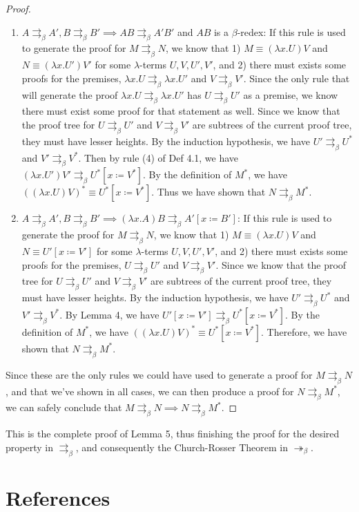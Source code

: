 \documentclass[a4paper,11pt]{article}
\theoremstyle{definition}
\theoremstyle{example}
\theoremstyle{lemma}
\newcommand{\lamterm}[2]{\lambda #1. #2}
\newcommand{\subs}[3]{#1[#2\coloneqq#3]}
\newcommand{\msbr}{\twoheadrightarrow_{\beta}}
\newcommand{\pbr}{\rightrightarrows_{\beta}}
\begin{document}
\begin{proof}
\begin{enumerate}[topsep=2pt,itemsep=-0.5ex,partopsep=1ex,parsep=1ex]
    \item $A \pbr A', B \pbr B' \implies AB \pbr A'B'$ and $AB$ is a $\beta$-redex: If this rule is used to generate the proof for $M \pbr N$, we know that 1) $M \equiv (\lamterm{x}{U})V$ and $N \equiv (\lamterm{x}{U'})V'$ for some $\lambda$-terms $U, V, U', V'$, and 2) there must exists some proofs for the premises, $\lamterm{x}{U} \pbr \lamterm{x}{U'}$ and $V \pbr V'$. Since the only rule that will generate the proof $\lamterm{x}{U} \pbr \lamterm{x}{U'}$ has $U \pbr U'$ as a premise, we know there must exist some proof for that statement as well. Since we know that the proof tree for $U \pbr U'$ and $V \pbr V'$ are subtrees of the current proof tree, they must have lesser heights. By the induction hypothesis, we have $U' \pbr U^*$ and $V' \pbr V^*$. Then by rule (4) of Def 4.1, we have $(\lamterm{x}{U'})V' \pbr \subs{U^*}{x}{V^*}$. By the definition of $M^*$, we have $((\lamterm{x}{U})V)^* \equiv \subs{U^*}{x}{V^*}$. Thus we have shown that $N \pbr M^*$.
     \item $A \pbr A', B \pbr B' \implies (\lamterm{x}{A})B \pbr \subs{A'}{x}{B'}$: If this rule is used to generate the proof for $M \pbr N$, we know that 1) $M \equiv (\lamterm{x}{U})V$ and $N \equiv \subs{U'}{x}{V'}$ for some $\lambda$-terms $U, V, U', V'$, and 2) there must exists some proofs for the premises, $U \pbr U'$ and $V \pbr V'$. Since we know that the proof tree for $U \pbr U'$ and $V \pbr V'$ are subtrees of the current proof tree, they must have lesser heights. By the induction hypothesis, we have $U' \pbr U^*$ and $V' \pbr V^*$. By Lemma 4, we have $\subs{U'}{x}{V'} \pbr \subs{U^*}{x}{V^*}$. By the definition of $M^*$, we have $((\lamterm{x}{U})V)^* \equiv \subs{U^*}{x}{V^*}$. Therefore, we have shown that $N \pbr M^*$.
\end{enumerate}
Since these are the only rules we could have used to generate a proof for $M \pbr N$, and that we've shown in all cases, we can then produce a proof for $N \pbr M^*$, we can safely conclude that $M \pbr N \implies N \pbr M^*$.
\end{proof}
This is the complete proof of Lemma 5, thus finishing the proof for the desired property in $\pbr$, and consequently the Church-Rosser Theorem in $\msbr$.

\newpage

\section{References}
\printbibliography[heading=none]
\end{document}
